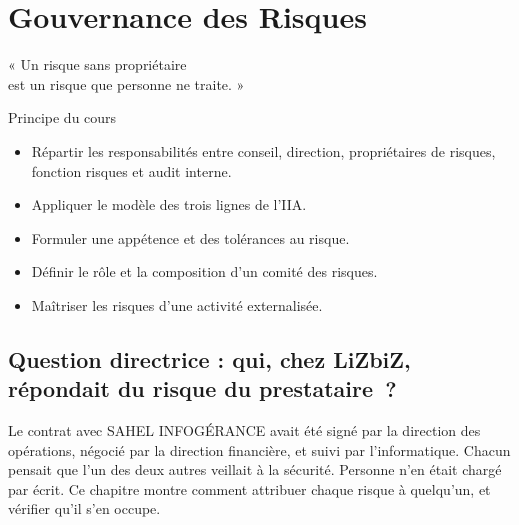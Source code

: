 
\chapter{Gouvernance des Risques}
\label{chap:gouvernance}

\epigraph{%
    « Un risque sans propriétaire\\
    est un risque que personne ne traite. »%
}{Principe du cours}


\begin{boxobjectifs}
\begin{itemize}
    \item Répartir les responsabilités entre conseil, direction, propriétaires
          de risques, fonction risques et audit interne.
    \item Appliquer le modèle des trois lignes de l'IIA.
    \item Formuler une appétence et des tolérances au risque.
    \item Définir le rôle et la composition d'un comité des risques.
    \item Maîtriser les risques d'une activité externalisée.
\end{itemize}
\end{boxobjectifs}

\bigskip

\section*{Question directrice : qui, chez LiZbiZ, répondait du risque du prestataire~?}

Le contrat avec SAHEL INFOGÉRANCE avait été signé par la direction des
opérations, négocié par la direction financière, et suivi par
l'informatique. Chacun pensait que l'un des deux autres veillait à la
sécurité. Personne n'en était chargé par écrit. Ce chapitre montre comment
attribuer chaque risque à quelqu'un, et vérifier qu'il s'en occupe.

